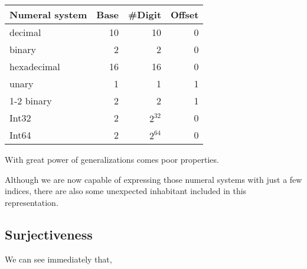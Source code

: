 \documentclass[../thesis.tex]{subfiles}
\begin{document}
\begin{center}
    \begin{adjustbox}{max width=\textwidth}
    \begin{tabular}{ | l | r | r | r | }
    \textbf{Numeral system} & \textbf{Base} & \textbf{\#Digit} & \textbf{Offset} \\
    \hline
    decimal         & 10 & 10 & 0 \\
    binary          & 2  & 2  & 0 \\
    hexadecimal     & 16 & 16 & 0 \\
    unary           & 1  & 1  & 1 \\
    1-2 binary      & 2  & 2  & 1 \\
    Int32           & 2  & $ 2^{32} $ & 0 \\
    Int64           & 2  & $ 2^{64} $ & 0 \\
    \end{tabular}
    \end{adjustbox}
\end{center}

With great power of generalizations comes poor properties.

Although we are now capable of expressing those numeral systems with just a few
indices, there are also some unexpected inhabitant included in this representation.

\subsection{Surjectiveness}
We can see immediately that,
\end{document}

